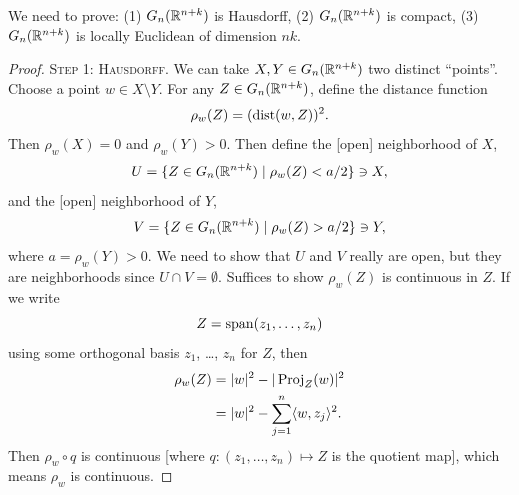 We need to prove: (1) $G_{n}(\mathbb{R}^{n+k})$ is Hausdorff, (2)
$G_{n}(\mathbb{R}^{n+k})$ is compact, (3) $G_{n}(\mathbb{R}^{n+k})$ is locally
Euclidean of dimension $nk$.

\begin{proof}
\textsc{Step 1: Hausdorff}.
We can take $X,Y\in G_{n}(\mathbb{R}^{n+k})$ two distinct ``points''. Choose
a point $w\in X\setminus Y$. For any $Z\in G_{n}(\mathbb{R}^{n+k})$, define
the distance function
\begin{equation}
\rho_{w}(Z)=(\operatorname{dist}(w,Z))^{2}.
\end{equation}
Then $\rho_{w}(X)=0$ and $\rho_{w}(Y)>0$. Then define the [open] neighborhood
of $X$,
\begin{equation}
U=\{Z\in G_{n}(\mathbb{R}^{n+k})\mid\rho_{w}(Z)<a/2\}\ni X,
\end{equation}
and the [open] neighborhood of $Y$,
\begin{equation}
V=\{Z\in G_{n}(\mathbb{R}^{n+k})\mid\rho_{w}(Z)>a/2\}\ni Y,
\end{equation}
where $a=\rho_{w}(Y)>0$. We need to show that $U$ and $V$ really are
open, but they are neighborhoods since $U\cap V=\emptyset$. Suffices
to show $\rho_{w}(Z)$ is continuous in $Z$. If we write
\begin{equation}
Z=\operatorname{span}(z_{1},\dots,z_{n})
\end{equation}
using some orthogonal basis $z_{1}$, \dots, $z_{n}$ for $Z$, then
\begin{subequations}
  \begin{align}
\rho_{w}(Z) &= |w|^{2}-|\operatorname{Proj}_{Z}(w)|^{2}\\
&=|w|^{2}-\sum^{n}_{j=1}\langle w,z_{j}\rangle^{2}.
  \end{align}
\end{subequations}
Then $\rho_{w}\circ q$ is continuous [where
  $q\colon(z_{1},\dots,z_{n})\mapsto Z$ is the quotient map], which means $\rho_{w}$ is continuous.
\end{proof}